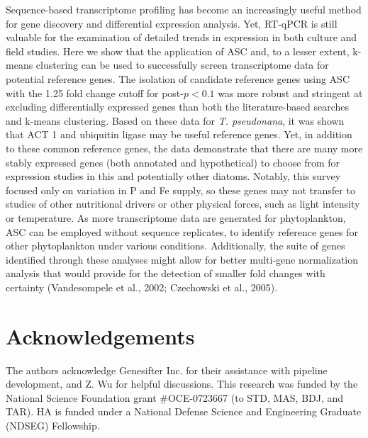 	Sequence-based transcriptome profiling has become an increasingly useful method for gene discovery and differential expression analysis. Yet, RT-qPCR is still valuable for the examination of detailed trends in expression in both culture and field studies. Here we show that the application of ASC and, to a lesser extent, k-means clustering can be used to successfully screen transcriptome data for potential reference genes. The isolation of candidate reference genes using ASC with the 1.25 fold change cutoff for post-$p < 0.1$ was more robust and stringent at excluding differentially expressed genes than both the literature-based searches and k-means clustering. Based on these data for \textit{T. pseudonana}, it was shown that ACT 1 and ubiquitin ligase may be useful reference genes. Yet, in addition to these common reference genes, the data demonstrate that there are many more stably expressed genes (both annotated and hypothetical) to choose from for expression studies in this and potentially other diatoms. Notably, this survey focused only on variation in P and Fe supply, so these genes may not transfer to studies of other nutritional drivers or other physical forces, such as light intensity or temperature. As more transcriptome data are generated for phytoplankton, ASC can be employed without sequence replicates, to identify reference genes for other phytoplankton under various conditions. Additionally, the suite of genes identified through these analyses might allow for better multi-gene normalization analysis that would provide for the detection of smaller fold changes with certainty (Vandesompele et al., 2002; Czechowski et al., 2005).\par

\section{Acknowledgements}
The authors acknowledge Genesifter Inc. for their assistance with pipeline development, and Z. Wu for helpful discussions. This research was funded by the National Science Foundation grant \#OCE-0723667 (to STD, MAS, BDJ, and TAR). HA is funded under a National Defense Science and Engineering Graduate (NDSEG) Fellowship.

